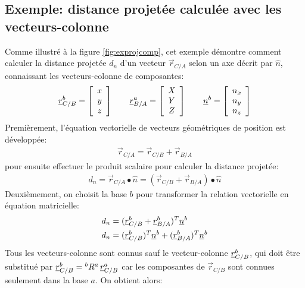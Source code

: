 \subsection{Exemple: distance projetée calculée avec les vecteurs-colonne}
%
Comme illustré à la figure \ref{fig:exprojcomp}, cet exemple démontre comment calculer la distance projetée $d_n$ d'un vecteur $\vec{r}_{C/A}$ selon un axe décrit par $\hat{n}$, connaissant les vecteurs-colonne de composantes:
\begin{align}
	\underline{r}_{C/B}^b = \left[ \begin{array}{c} x \\ y \\ z  \end{array} \right]
	\quad\quad
	\underline{r}_{B/A}^a = \left[ \begin{array}{c} X \\ Y \\ Z  \end{array} \right]
	\quad\quad
	\underline{n}^b       = \left[ \begin{array}{c} n_x \\ n_y \\ n_z  \end{array} \right]
	\label{eq:disprojexdef}
\end{align}
Premièrement, l'équation vectorielle de vecteurs géométriques de position est développée:
\begin{align}
	\vec{r}_{C/A} = \vec{r}_{C/B} + \vec{r}_{B/A}
\end{align}
pour ensuite effectuer le produit scalaire pour calculer la distance projetée:
\begin{align}
	d_n = \vec{r}_{C/A} \bullet \hat{n} = (\vec{r}_{C/B} + \vec{r}_{B/A} ) \bullet \hat{n}
\end{align}
Deuxièmement, on choisit la base $b$ pour transformer la relation vectorielle en équation matricielle:
\begin{align}
	d_n &= (\underline{r}_{C/B}^b + \underline{r}_{B/A}^b )^T \underline{n}^b \\
	d_n &= ( \underline{r}_{C/B}^b )^T \underline{n}^b + ( \underline{r}_{B/A}^b )^T \underline{n}^b
\end{align}
Tous les vecteurs-colonne sont connus sauf le vecteur-colonne $\underline{r}_{C/B}^b$, qui doit être substitué par $\underline{r}_{C/B}^b = {}^bR^a \, \underline{r}_{C/B}^a$ car les composantes de $\vec{r}_{C/B}$ sont connues seulement dans la base $a$. On obtient alors:
